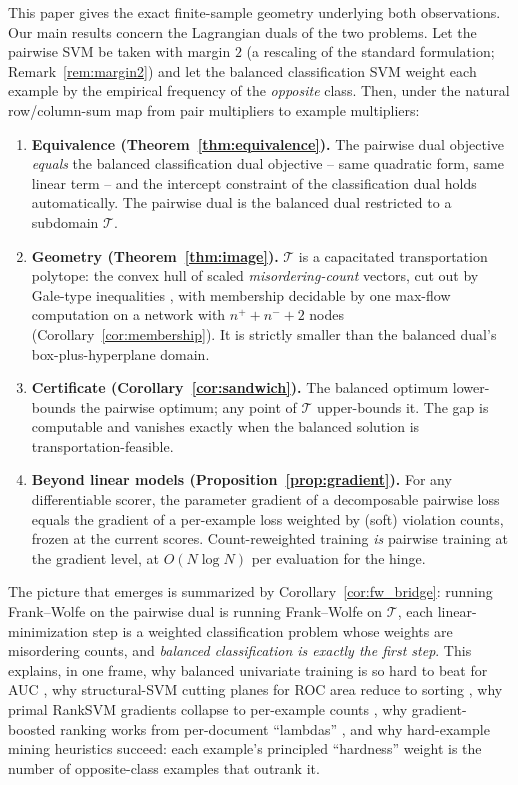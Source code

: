 \documentclass[11pt]{article}
\theoremstyle{remark}
\begin{document}
This paper gives the exact finite-sample geometry underlying both
observations. Our main results concern the Lagrangian duals of the two
problems. Let the pairwise SVM be taken with margin $2$ (a rescaling of the
standard formulation; Remark~\ref{rem:margin2}) and let the balanced
classification SVM weight each example by the empirical frequency of the
\emph{opposite} class. Then, under the natural row/column-sum map from pair
multipliers to example multipliers:
\begin{enumerate}
\item \textbf{Equivalence (Theorem~\ref{thm:equivalence}).} The pairwise dual
objective \emph{equals} the balanced classification dual objective -- same
quadratic form, same linear term -- and the intercept constraint of the
classification dual holds automatically. The pairwise dual is the balanced
dual restricted to a subdomain $\mathcal{T}$.
\item \textbf{Geometry (Theorem~\ref{thm:image}).} $\mathcal{T}$ is a
capacitated transportation polytope: the convex hull of scaled
\emph{misordering-count} vectors, cut out by Gale-type inequalities
\citep{gale1957}, with membership decidable by one max-flow computation on a
network with $n^+ + n^- + 2$ nodes (Corollary~\ref{cor:membership}). It is
strictly smaller than the balanced dual's box-plus-hyperplane domain.
\item \textbf{Certificate (Corollary~\ref{cor:sandwich}).} The balanced
optimum lower-bounds the pairwise optimum; any point of $\mathcal{T}$
upper-bounds it. The gap is computable and vanishes exactly when the
balanced solution is transportation-feasible.
\item \textbf{Beyond linear models (Proposition~\ref{prop:gradient}).} For
any differentiable scorer, the parameter gradient of a decomposable pairwise
loss equals the gradient of a per-example loss weighted by (soft) violation
counts, frozen at the current scores. Count-reweighted training \emph{is}
pairwise training at the gradient level, at $O(N \log N)$ per evaluation for
the hinge.
\end{enumerate}
The picture that emerges is summarized by
Corollary~\ref{cor:fw_bridge}: running Frank--Wolfe
\citep{frank1956,jaggi2013} on the pairwise dual is running Frank--Wolfe on
$\mathcal{T}$, each linear-minimization step is a weighted classification
problem whose weights are misordering counts, and \emph{balanced
classification is exactly the first step}. This explains, in one frame, why
balanced univariate training is so hard to beat for AUC
\citep{kotlowski2011}, why structural-SVM cutting planes for ROC area reduce
to sorting \citep{joachims2005}, why primal RankSVM gradients collapse to
per-example counts \citep{chapelle2010}, why gradient-boosted ranking works
from per-document ``lambdas'' \citep{burges2010}, and why hard-example
mining heuristics \citep{shrivastava2016,lin2017} succeed: each example's
principled ``hardness'' weight is the number of opposite-class examples that
outrank it.
\end{document}
